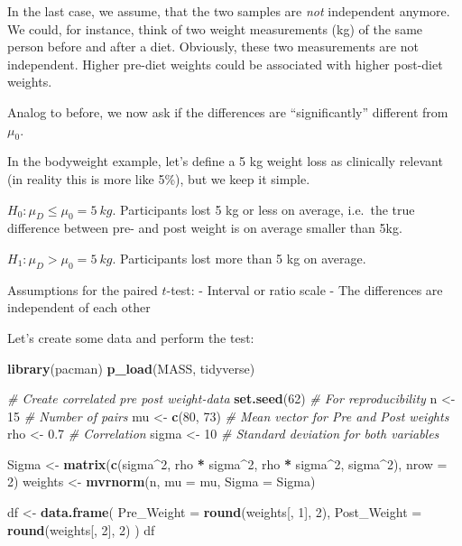 \documentclass[
]{book}
\newenvironment{Shaded}{\begin{snugshade}}{\end{snugshade}}
\newcommand{\AttributeTok}[1]{\textcolor[rgb]{0.13,0.29,0.53}{#1}}
\newcommand{\CommentTok}[1]{\textcolor[rgb]{0.56,0.35,0.01}{\textit{#1}}}
\newcommand{\DecValTok}[1]{\textcolor[rgb]{0.00,0.00,0.81}{#1}}
\newcommand{\FloatTok}[1]{\textcolor[rgb]{0.00,0.00,0.81}{#1}}
\newcommand{\FunctionTok}[1]{\textcolor[rgb]{0.13,0.29,0.53}{\textbf{#1}}}
\newcommand{\NormalTok}[1]{#1}
\newcommand{\OtherTok}[1]{\textcolor[rgb]{0.56,0.35,0.01}{#1}}
\newcommand{\SpecialCharTok}[1]{\textcolor[rgb]{0.81,0.36,0.00}{\textbf{#1}}}
\begin{document}
In the last case, we assume, that the two samples are \emph{not} independent anymore. We could, for instance,
think of two weight measurements (kg) of the same person before and after a diet. Obviously,
these two measurements are not independent. Higher pre-diet weights could be associated
with higher post-diet weights.

Analog to before, we now ask if the differences are ``significantly'' different from \(\mu_0\).

In the bodyweight example, let's define a 5 kg weight loss as clinically relevant
(in reality this is more like 5\%), but we keep it simple.

\(H_0: \mu_D \le \mu_0 = 5~kg\). Participants lost 5 kg or less on average,
i.e.~the true difference between pre- and post weight is on average smaller than 5kg.

\(H_1: \mu_D > \mu_0 = 5~kg\). Participants lost more than 5 kg on average.

Assumptions for the paired \(t\)-test:
- Interval or ratio scale
- The differences are independent of each other

Let's create some data and perform the test:

\begin{Shaded}
\begin{Highlighting}[]
\FunctionTok{library}\NormalTok{(pacman)}
\FunctionTok{p\_load}\NormalTok{(MASS, tidyverse)}

\CommentTok{\# Create correlated pre post weight{-}data}
\FunctionTok{set.seed}\NormalTok{(}\DecValTok{62}\NormalTok{)  }\CommentTok{\# For reproducibility}
\NormalTok{n }\OtherTok{\textless{}{-}} \DecValTok{15}  \CommentTok{\# Number of pairs}
\NormalTok{mu }\OtherTok{\textless{}{-}} \FunctionTok{c}\NormalTok{(}\DecValTok{80}\NormalTok{, }\DecValTok{73}\NormalTok{)  }\CommentTok{\# Mean vector for Pre and Post weights}
\NormalTok{rho }\OtherTok{\textless{}{-}} \FloatTok{0.7}  \CommentTok{\# Correlation}
\NormalTok{sigma }\OtherTok{\textless{}{-}} \DecValTok{10}  \CommentTok{\# Standard deviation for both variables}

\NormalTok{Sigma }\OtherTok{\textless{}{-}} \FunctionTok{matrix}\NormalTok{(}\FunctionTok{c}\NormalTok{(sigma}\SpecialCharTok{\^{}}\DecValTok{2}\NormalTok{, rho }\SpecialCharTok{*}\NormalTok{ sigma}\SpecialCharTok{\^{}}\DecValTok{2}\NormalTok{, rho }\SpecialCharTok{*}\NormalTok{ sigma}\SpecialCharTok{\^{}}\DecValTok{2}\NormalTok{, sigma}\SpecialCharTok{\^{}}\DecValTok{2}\NormalTok{), }\AttributeTok{nrow =} \DecValTok{2}\NormalTok{)}
\NormalTok{weights }\OtherTok{\textless{}{-}} \FunctionTok{mvrnorm}\NormalTok{(n, }\AttributeTok{mu =}\NormalTok{ mu, }\AttributeTok{Sigma =}\NormalTok{ Sigma)}

\NormalTok{df }\OtherTok{\textless{}{-}} \FunctionTok{data.frame}\NormalTok{(}
  \AttributeTok{Pre\_Weight =} \FunctionTok{round}\NormalTok{(weights[, }\DecValTok{1}\NormalTok{], }\DecValTok{2}\NormalTok{),}
  \AttributeTok{Post\_Weight =} \FunctionTok{round}\NormalTok{(weights[, }\DecValTok{2}\NormalTok{], }\DecValTok{2}\NormalTok{)}
\NormalTok{)}
\NormalTok{df}
\end{Highlighting}
\end{Shaded}
\end{document}
